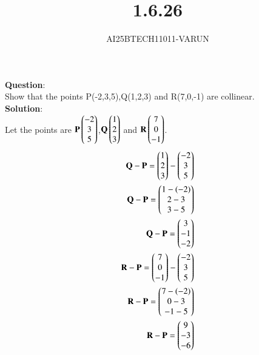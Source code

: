 \documentclass[journal]{IEEEtran}
\begin{document}

\vspace{3cm}

\title{1.6.26}
\author{AI25BTECH11011-VARUN}
 \maketitle
{\let\newpage\relax\maketitle}

\renewcommand{\thefigure}{\theenumi}
\renewcommand{\thetable}{\theenumi}
\setlength{\intextsep}{10pt} %


\renewcommand{\thetable}{\theenumi}
\textbf{Question}:\\
Show that the points P(-2,3,5),Q(1,2,3) and R(7,0,-1) are collinear.  \\
\textbf{Solution}:\\
Let the points are $\mathbf{P}\begin{pmatrix}-2\\3\\5\end{pmatrix}$,$\mathbf{Q}\begin{pmatrix}1\\2\\3\end{pmatrix}$ and $\mathbf{R}\begin{pmatrix}7\\0\\-1\end{pmatrix}$.
\begin{align}
\mathbf{Q} - \mathbf{P} = \begin{pmatrix}1\\2\\3\end{pmatrix} - \begin{pmatrix}-2\\3\\5\end{pmatrix}  \\
\mathbf{Q} - \mathbf{P} = \begin{pmatrix}1-(-2)\\2-3\\3-5\end{pmatrix}  \\
\mathbf{Q} - \mathbf{P} = \begin{pmatrix}3\\-1\\-2\end{pmatrix}  \\
\mathbf{R} - \mathbf{P} = \begin{pmatrix}7\\0\\-1\end{pmatrix} - \begin{pmatrix}-2\\3\\5\end{pmatrix}  \\
\mathbf{R} - \mathbf{P} = \begin{pmatrix}7-(-2)\\0-3\\-1-5\end{pmatrix}  \\
\mathbf{R} - \mathbf{P} = \begin{pmatrix}9\\-3\\-6\end{pmatrix}  \\
\end{align}
\end{document}
